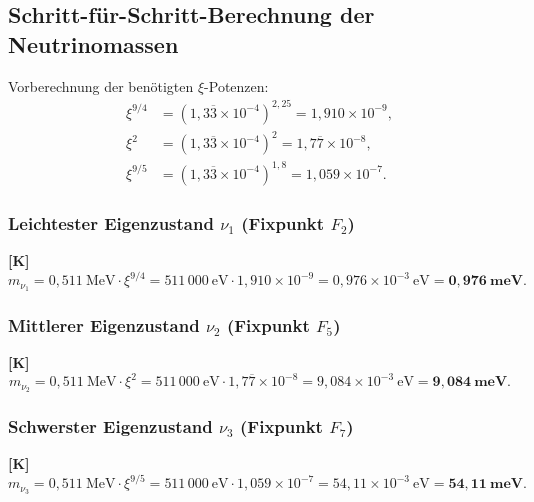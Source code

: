 \subsection{Schritt-für-Schritt-Berechnung der Neutrinomassen}

Vorberechnung der benötigten $\xi$-Potenzen:
\begin{align}
  \xi^{9/4} &= (1{,}3\overline{3}\times10^{-4})^{2{,}25}
             = 1{,}910\times10^{-9}, \label{eq:xi94} \\
  \xi^{2}   &= (1{,}3\overline{3}\times10^{-4})^{2}
             = 1{,}7\overline{7}\times10^{-8}, \label{eq:xi2} \\
  \xi^{9/5} &= (1{,}3\overline{3}\times10^{-4})^{1{,}8}
             = 1{,}059\times10^{-7}. \label{eq:xi95}
\end{align}

\subsubsection{Leichtester Eigenzustand $\nu_1$ (Fixpunkt $F_2$)}

\textbf{[K]}
\begin{equation}
  m_{\nu_1} = 0{,}511~\text{MeV} \cdot \xi^{9/4}
            = 511\,000~\text{eV} \cdot 1{,}910\times10^{-9}
            = 0{,}976\times10^{-3}~\text{eV}
            = \mathbf{0{,}976}~\mathbf{meV}.
\end{equation}

\subsubsection{Mittlerer Eigenzustand $\nu_2$ (Fixpunkt $F_5$)}

\textbf{[K]}
\begin{equation}
  m_{\nu_2} = 0{,}511~\text{MeV} \cdot \xi^{2}
            = 511\,000~\text{eV} \cdot 1{,}7\overline{7}\times10^{-8}
            = 9{,}084\times10^{-3}~\text{eV}
            = \mathbf{9{,}084}~\mathbf{meV}.
\end{equation}

\subsubsection{Schwerster Eigenzustand $\nu_3$ (Fixpunkt $F_7$)}

\textbf{[K]}
\begin{equation}
  m_{\nu_3} = 0{,}511~\text{MeV} \cdot \xi^{9/5}
            = 511\,000~\text{eV} \cdot 1{,}059\times10^{-7}
            = 54{,}11\times10^{-3}~\text{eV}
            = \mathbf{54{,}11}~\mathbf{meV}.
\end{equation}

